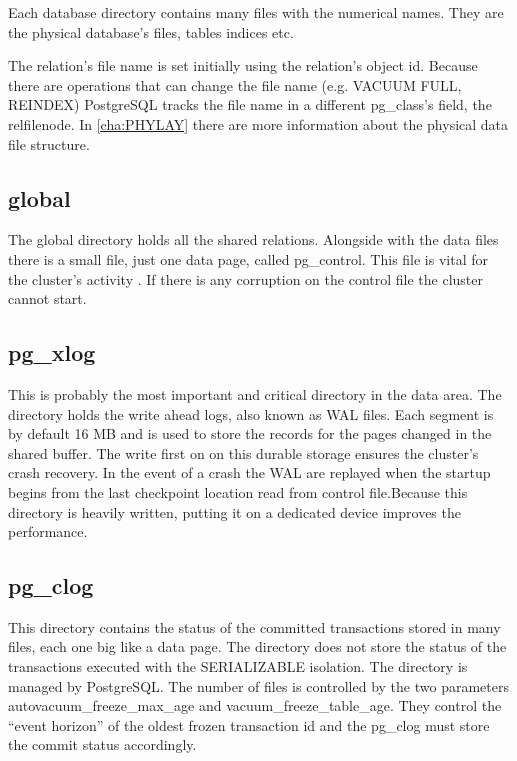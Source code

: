 Each database directory contains many files with the numerical names. They are the
physical database's files, tables indices etc.\newline 

The relation's file name is set initially using the relation's object id. Because there are
operations that  can change the file name (e.g. VACUUM FULL, REINDEX) PostgreSQL tracks the file
name in a different pg\_class's field, the relfilenode. In \ref{cha:PHYLAY} there are
more information about the physical data file structure.

\subsection{global}
The global directory holds all the shared relations. Alongside with the data files there is a small
file, just one data page, called pg\_control. This file is vital for the cluster's activity
. If there is any corruption on the control file the cluster cannot start.

\subsection{pg\_xlog}
This is probably the most important and critical directory in the data area. The directory holds
the write ahead logs,  also known as WAL files. Each segment is by default 16 MB
and is used to store the records for the pages changed in the shared buffer. The write first
on on this durable storage ensures the cluster's crash recovery. In the event of a crash
the WAL are replayed when the startup begins from the last checkpoint location read from control
file.Because this directory is heavily written, putting it on a dedicated device improves the
performance. 

\subsection{pg\_clog}
This directory contains the status of the committed transactions stored in many files, each one
big like a data page. The directory does not store the status of the transactions executed
with the SERIALIZABLE isolation. The directory is managed by PostgreSQL. The number of files is
controlled by the two parameters autovacuum\_freeze\_max\_age and vacuum\_freeze\_table\_age.
They control the ``event horizon'' of the oldest frozen transaction id and the pg\_clog must
store the commit status accordingly. 

